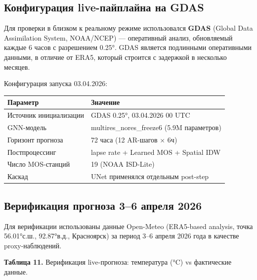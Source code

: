 \documentclass[14pt,a4paper]{extarticle}
\newcounter{none}
\numberwithin{table}{section}
\numberwithin{figure}{section}
\numberwithin{equation}{section}
\begin{document}
\subsection{Конфигурация live-пайплайна на GDAS}\label{ux43aux43eux43dux444ux438ux433ux443ux440ux430ux446ux438ux44f-live-ux43fux430ux439ux43fux43bux430ux439ux43dux430-ux43dux430-gdas}

Для проверки в близком к реальному режиме использовался \textbf{GDAS}
(Global Data Assimilation System, NOAA/NCEP) --- оперативный анализ,
обновляемый каждые 6 часов с разрешением 0.25°. GDAS является подлинными
оперативными данными, в отличие от ERA5, который строится с задержкой в
несколько месяцев.

Конфигурация запуска 03.04.2026:

{\def\LTcaptype{none} %
\begin{longtable}[]{@{}ll@{}}
\toprule\noalign{}
Параметр & Значение \\
\midrule\noalign{}
\endhead
\bottomrule\noalign{}
\endlastfoot
Источник инициализации & GDAS 0.25°, 03.04.2026 00 UTC \\
GNN-модель & multires\_nores\_freeze6 (5.9M параметров) \\
Горизонт прогноза & 72 часа (12 AR-шагов × 6ч) \\
Постпроцессинг & lapse rate + Learned MOS + Spatial IDW \\
Число MOS-станций & 19 (NOAA ISD-Lite) \\
Каскад & UNet применялся отдельным post-step \\
\end{longtable}
}

\subsection{Верификация прогноза 3--6 апреля 2026}\label{ux432ux435ux440ux438ux444ux438ux43aux430ux446ux438ux44f-ux43fux440ux43eux433ux43dux43eux437ux430-36-ux430ux43fux440ux435ux43bux44f-2026}

Для верификации использованы данные Open-Meteo (ERA5-based analysis,
точка 56.01°с.ш., 92.87°в.д., Красноярск) за период 3--6 апреля 2026
года в качестве proxy-наблюдений.

\textbf{Таблица 11.} Верификация live-прогноза: температура (°C) vs
фактические данные.
\end{document}
